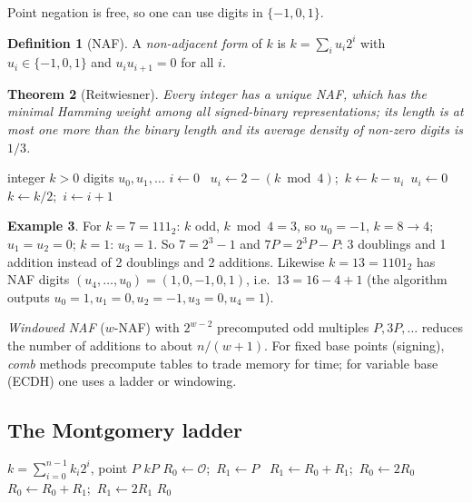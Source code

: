 \documentclass[11pt,a4paper,oneside]{book}
\theoremstyle{plain}
\newtheorem{theorem}{Theorem}[chapter]
\theoremstyle{definition}
\newtheorem{definition}[theorem]{Definition}
\newtheorem{example}[theorem]{Example}
\theoremstyle{remark}
\newcommand{\Oinf}{\mathcal{O}}
\begin{document}
Point negation is free, so one can use digits in $\{-1,0,1\}$.

\begin{definition}[NAF]
A \emph{non-adjacent form} of $k$ is $k=\sum_{i}u_i2^i$ with $u_i\in\{-1,0,1\}$ and $u_iu_{i+1}=0$ for all $i$.
\end{definition}

\begin{theorem}[Reitwiesner]\label{thm:naf}
Every integer has a unique NAF, which has the minimal Hamming weight among all signed-binary representations; its length is at most one more than the binary length and its average density of non-zero digits is $1/3$.
\end{theorem}

\begin{algorithm}[ht]
\caption{Computing the NAF}
\begin{algorithmic}[1]
\Require integer $k>0$ \Ensure digits $u_0,u_1,\dots$
\State $i\gets0$
  \ $u_i\gets 2-(k\bmod4)$;\ $k\gets k-u_i$\Else\ $u_i\gets0$\EndIf
  \State $k\gets k/2$;\ $i\gets i+1$
\EndWhile
\end{algorithmic}
\end{algorithm}

\begin{example}
For $k=7=111_2$: $k$ odd, $k\bmod4=3$, so $u_0=-1$, $k=8\to4$; $u_1=u_2=0$; $k=1$: $u_3=1$. So $7=2^3-1$ and $7P=2^3P-P$: 3 doublings and 1 addition instead of 2 doublings and 2 additions.
Likewise $k=13=1101_2$ has NAF digits $(u_4,\dots,u_0)=(1,0,-1,0,1)$, i.e.\ $13=16-4+1$ (the algorithm outputs $u_0=1,u_1=0,u_2=-1,u_3=0,u_4=1$).
\end{example}

\emph{Windowed NAF} ($w$-NAF) with $2^{w-2}$ precomputed odd multiples $P,3P,\dots$ reduces the number of additions to about $n/(w+1)$. For fixed base points (signing), \emph{comb} methods precompute tables to trade memory for time; for variable base (ECDH) one uses a ladder or windowing.

\subsection{The Montgomery ladder}\label{sec:ladder}

\begin{algorithm}[ht]
\caption{Montgomery ladder (uniform, no key-dependent branches except by selection)}\label{alg:ladder}
\begin{algorithmic}[1]
\Require $k=\sum_{i=0}^{n-1}k_i2^i$, point $P$ \Ensure $kP$
\State $R_0\gets\Oinf$;\ $R_1\gets P$
  \ $R_1\gets R_0+R_1$;\ $R_0\gets 2R_0$
  \Else\ $R_0\gets R_0+R_1$;\ $R_1\gets 2R_1$\EndIf
\EndFor
\State \Return $R_0$
\end{algorithmic}
\end{algorithm}
\end{document}
